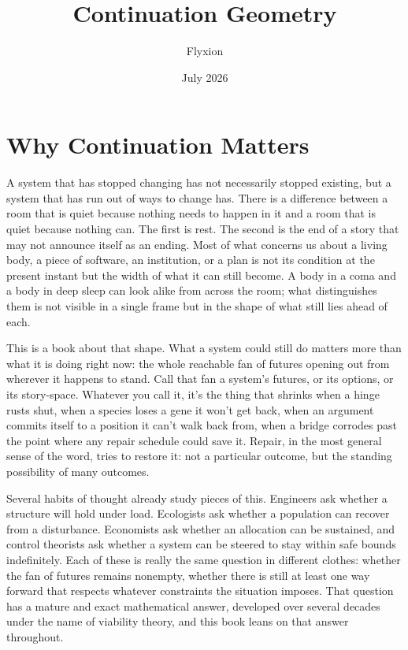 \documentclass[11pt]{report}
\title{\textbf{Continuation Geometry}}
\author{Flyxion}
\date{July 2026}
\begin{document}
\maketitle

\tableofcontents

\chapter{Why Continuation Matters}

A system that has stopped changing has not necessarily stopped existing,
but a system that has run out of ways to change has. There is a
difference between a room that is quiet because nothing needs to happen
in it and a room that is quiet because nothing can. The first is rest.
The second is the end of a story that may not announce itself as an
ending. Most of what concerns us about a living body, a piece of
software, an institution, or a plan is not its condition at the present
instant but the width of what it can still become. A body in a coma and
a body in deep sleep can look alike from across the room; what
distinguishes them is not visible in a single frame but in the shape of
what still lies ahead of each.

This is a book about that shape. What a system could still do matters
more than what it is doing right now: the whole reachable fan of
futures opening out from wherever it happens to stand. Call that fan a
system's futures, or its options, or its story-space. Whatever you
call it, it's the thing that shrinks when a hinge rusts shut, when a
species loses a gene it won't get back, when an argument commits
itself to a position it can't walk back from, when a bridge corrodes
past the point where any repair schedule could save it. Repair, in the
most general sense of the word, tries to restore it: not a particular
outcome, but the standing
possibility of many outcomes.

Several habits of thought already study pieces of this. Engineers ask
whether a structure will hold under load. Ecologists ask whether a
population can recover from a disturbance. Economists ask whether an
allocation can be sustained, and control theorists ask whether a
system can be steered to stay within safe bounds indefinitely. Each of
these is really the same question in different clothes: whether the
fan of futures remains nonempty, whether there is still at least one
way forward that respects whatever constraints the situation imposes.
That question has a mature and exact mathematical answer, developed
over several decades under the name of viability theory, and this book
leans on that answer throughout.
\end{document}
